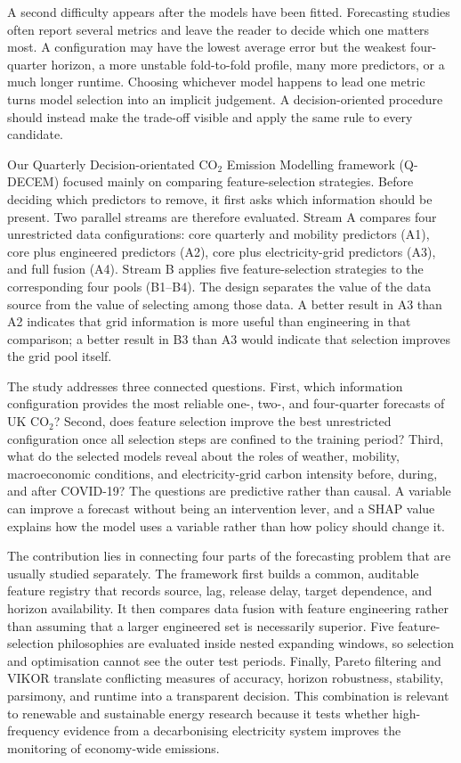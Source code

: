 \documentclass[preprint,12pt]{elsarticle}
\newcommand{\coo}{CO$_2$}
\newcommand{\qdecem}{Q-DECEM}
\begin{document}
A second difficulty appears after the models have been fitted. Forecasting studies often report several metrics and leave the reader to decide which one matters most. A configuration may have the lowest average error but the weakest four-quarter horizon, a more unstable fold-to-fold profile, many more predictors, or a much longer runtime. Choosing whichever model happens to lead one metric turns model selection into an implicit judgement. A decision-oriented procedure should instead make the trade-off visible and apply the same rule to every candidate.

Our Quarterly Decision-orientated CO$_2$ Emission Modelling framework (\qdecem{}) focused mainly on comparing feature-selection strategies. Before deciding which predictors to remove, it first asks which information should be present. Two parallel streams are therefore evaluated. Stream A compares four unrestricted data configurations: core quarterly and mobility predictors (A1), core plus engineered predictors (A2), core plus electricity-grid predictors (A3), and full fusion (A4). Stream B applies five feature-selection strategies to the corresponding four pools (B1--B4). The design separates the value of the data source from the value of selecting among those data. A better result in A3 than A2 indicates that grid information is more useful than engineering in that comparison; a better result in B3 than A3 would indicate that selection improves the grid pool itself.

The study addresses three connected questions. First, which information configuration provides the most reliable one-, two-, and four-quarter forecasts of UK \coo{}? Second, does feature selection improve the best unrestricted configuration once all selection steps are confined to the training period? Third, what do the selected models reveal about the roles of weather, mobility, macroeconomic conditions, and electricity-grid carbon intensity before, during, and after COVID-19? The questions are predictive rather than causal. A variable can improve a forecast without being an intervention lever, and a SHAP value explains how the model uses a variable rather than how policy should change it.

The contribution lies in connecting four parts of the forecasting problem that are usually studied separately. The framework first builds a common, auditable feature registry that records source, lag, release delay, target dependence, and horizon availability. It then compares data fusion with feature engineering rather than assuming that a larger engineered set is necessarily superior. Five feature-selection philosophies are evaluated inside nested expanding windows, so selection and optimisation cannot see the outer test periods. Finally, Pareto filtering and VIKOR translate conflicting measures of accuracy, horizon robustness, stability, parsimony, and runtime into a transparent decision. This combination is relevant to renewable and sustainable energy research because it tests whether high-frequency evidence from a decarbonising electricity system improves the monitoring of economy-wide emissions.
\end{document}
